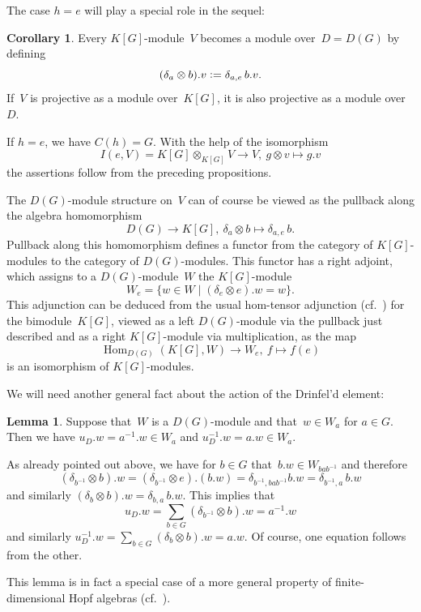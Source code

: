 \documentclass[12pt]{article}
\makeatletter
\theoremstyle{definition}
\newtheorem{Lemma}[Satz]{Lemma}
\newtheorem{Cor}[Satz]{Corollary}
\theoremstyle{break}
\renewenvironment{proof}[1][\proofname]{\par
\vspace{-5pt}%
\pushQED{\qed}%
\normalfont
\topsep0pt \partopsep0pt %
\trivlist
\item[\hskip\labelsep
\bfseries
#1\@addpunct{.}]\ignorespaces
}{%
\popQED\endtrivlist\@endpefalse
\addvspace{6pt plus 6pt} %
}
\DeclareMathOperator\Hom{Hom}
\renewcommand{\1}{\mathbbm{1}}
\newcommand{\ot}{\mathbin{\otimes}}
\newcommand{\deq}{\vcentcolon =}
\newcommand\Cent{C}
\makeatother
\begin{document}
The case $h = e$ will play a special role in the sequel:
\begin{Cor} \label{TrivConjClass}
Every $K[G]$-module~$V$ becomes a module over~$D = D(G)$ by defining
\[(\delta_a \ot b).v \deq \delta_{a,e} \, b.v.\]
If~$V$ is projective as a module over~$K[G]$, it is also projective as a module over~$D$.
\end{Cor}
\begin{proof}
If $h = e$, we have $\Cent(h) = G$. With the help of the isomorphism 
\[I(e, V) = K[G] \ot_{K[G]} V \to V,~g \ot v \mapsto g.v\]
the assertions follow from the preceding propositions.
\end{proof}

The $D(G)$-module structure on~$V$ can of course be viewed as the pullback along the algebra homomorphism
\[D(G) \to K[G],~\delta_a \ot b \mapsto \delta_{a,e} \, b.\]
Pullback along this homomorphism defines a functor from the category of \mbox{$K[G]$-mod}\-ules to the category of $D(G)$-modules. This functor has a right adjoint, which assigns to a $D(G)$-module~$W$ the $K[G]$-module
\[W_e = \{w \in W \mid (\delta_e \ot e).w = w \}.\]
This adjunction can be deduced from the usual hom-tensor adjunction (cf.~\cite[Lem.~19.11, p.~225]{AF}) for the bimodule~$K[G]$, viewed as a left $D(G)$-module via the pullback just described and as a right $K[G]$-module via multiplication, as the map
\[\Hom_{D(G)}(K[G],W) \to W_e,~f \mapsto f(e)\]
is an isomorphism of $K[G]$-modules.

\pagebreak

We will need another general fact about the action of the Drinfel'd element:
\begin{Lemma} \label{ActDrinf}
Suppose that~$W$ is a $D(G)$-module and that~$w \in W_a$ for $a \in G$. Then we have $u_D.w = a^{-1}.w \in W_a$ and $u_D^{-1}.w = a.w \in W_a$.
\end{Lemma}
\begin{proof}
As already pointed out above, we have for $b \in G$ that~$b.w \in W_{bab^{-1}}$ and therefore
\[(\delta_{b^{-1}} \ot b).w = (\delta_{b^{-1}} \ot e).(b.w)
= \delta_{b^{-1},bab^{-1}} b.w = \delta_{b^{-1}, a} \, b.w\]
and similarly $(\delta_{b} \ot b).w = \delta_{b, a} \, b.w$. This implies that
\[u_D.w = \sum_{b \in G} (\delta_{b^{-1}} \ot b).w = a^{-1}.w\]
and similarly $u_D^{-1}.w= \sum_{b \in G} (\delta_{b} \ot b).w = a.w$. Of course, one equation follows from the other.
\end{proof}

This lemma is in fact a special case of a more general property of finite-dimensional Hopf algebras (cf.~\cite[Par.~3.9, p.~445]{So}).
\end{document}
